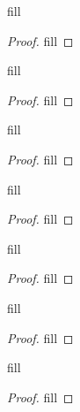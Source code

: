 \begin{exercise}{21}
fill
\end{exercise}
\begin{proof}
fill
\end{proof}

\begin{exercise}{24}
fill
\end{exercise}
\begin{proof}
fill
\end{proof}

\begin{exercise}{25}
fill
\end{exercise}
\begin{proof}
fill
\end{proof}

\begin{exercise}{26}
fill
\end{exercise}
\begin{proof}
fill
\end{proof}

\begin{exercise}{27}
fill
\end{exercise}
\begin{proof}
fill
\end{proof}

\begin{exercise}{33}
fill
\end{exercise}
\begin{proof}
fill
\end{proof}

\begin{exercise}{37}
fill
\end{exercise}
\begin{proof}
fill
\end{proof}
